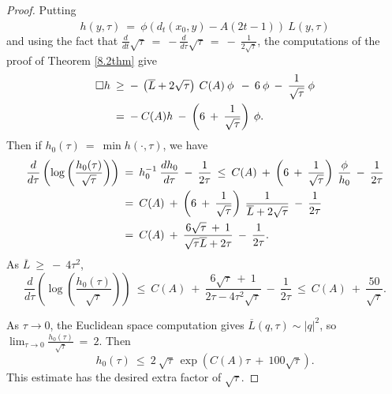 \documentclass[12pt]{amsart}
\numberwithin{equation}{section}
\theoremstyle{plain}
\theoremstyle{definition}
\theoremstyle{remark}
\begin{document}
\begin{proof}
Putting
\begin{equation}
h(y, \tau) \: = \: \phi(d_t(x_0, y) - A (2t-1)) \: \hat{L}(y, \tau)
\end{equation} 
and using the fact that $\frac{d}{dt} \sqrt{\tau} \: = \:
- \frac{d}{d\tau} \sqrt{\tau} \: = \: - \: \frac{1}{2 \sqrt{\tau}}$, 
the computations of the proof of Theorem \ref{8.2thm} give
\begin{align}
\square h \: & \ge \: - \: \left( \overline{L} + 2 \sqrt{\tau} \right) 
\: C(A) \: \phi \:
\: - \: 6 \: \phi \: - \: \frac{1}{\sqrt{\tau}} \: \phi \\
& = \: - \: C(A) h \: - \: \left( 6 \: + \: \frac{1}{\sqrt{\tau}} 
\right) \: \phi.
\notag
\end{align}
Then if  $h_0(\tau) \: = \: \min h(\cdot, \tau)$, we have
\begin{align}
\frac{d}{d\tau} \left( \log \left( \frac{h_0(\tau)}{\sqrt{\tau}} \right) 
\right) \: & = \: h_0^{-1} \: \frac{dh_0}{d\tau} \: - \: \frac{1}{2\tau} 
\: \le \: C(A) \: + \: \left( 6 \: + \: \frac{1}{\sqrt{\tau}} \right)
\: \frac{\phi}{h_0} \: - \: \frac{1}{2\tau} \\
& = \: C(A) \: + \: \left( 6 \: + \: \frac{1}{\sqrt{\tau}} \right)
\: \frac{1}{\overline{L} + 2 \sqrt{\tau}} \: - \: \frac{1}{2\tau} \notag \\
& = \: C(A) \: + \: 
\frac{6 \sqrt{\tau} \: + \: 1}{\sqrt{\tau} \overline{L} + 2 {\tau}} \: 
- \: \frac{1}{2\tau}. \notag
\end{align}
As $\overline{L} \: \ge \: - \: 4 \tau^2$,
\begin{equation}
\frac{d}{d\tau} \left( \log \left( \frac{h_0(\tau)}{\sqrt{\tau}} \right) 
\right) \:  \le \:
C(A) \: + \: 
\frac{6 \sqrt{\tau} \: + \: 1}{2 {\tau} - 4 \tau^2 \sqrt{\tau}} \: 
- \: \frac{1}{2\tau} \: \le \: C(A) \: + \: \frac{50}{\sqrt{\tau}}.
\end{equation}

As $\tau \rightarrow 0$, the Euclidean space computation gives
$\overline{L}(q, \tau) \sim |q|^2$, so
$\lim_{\tau \rightarrow 0} \frac{h_0(\tau)}{\sqrt{\tau}} \: = \: 2$.
Then
\begin{equation}
{h_0(\tau)} \: \le \:
2 \: \sqrt{\tau} \: \exp(C(A) \tau \: + \: 100 \sqrt{\tau}). 
\end{equation}
This estimate has the desired extra factor of $\sqrt{\tau}$.


\end{proof}
\end{document}
